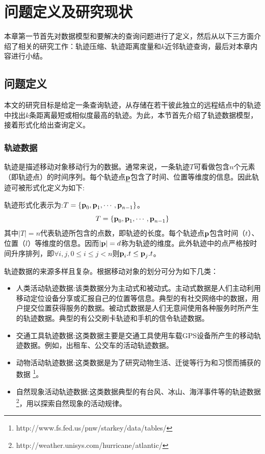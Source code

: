 \chapter{问题定义及研究现状}\label{chapter:relatedwork}
本章第一节首先对数据模型和要解决的查询问题进行了定义，然后从以下三方面介绍了相关的研究工作：轨迹压缩、轨迹距离度量和$k$近邻轨迹查询，最后对本章内容进行小结。

\section{问题定义}\label{chapter-related-coll}
本文的研究目标是给定一条查询轨迹，从存储在若干彼此独立的远程结点中的轨迹中找出$k$条距离最短或相似度最高的轨迹。为此，本节首先介绍了轨迹数据模型，接着形式化给出查询定义。

\subsection{轨迹数据}
轨迹是描述移动对象移动行为的数据。通常来说，一条轨迹$T$可看做包含$n$个元素（即轨迹点）的时间序列。每个轨迹点$\emph{{\textbf{p}}}$包含了时间、位置等维度的信息。因此轨迹可被形式化定义为如下:
\begin{define}[轨迹]
轨迹形式化表示为:$T=\{\textbf{p}_{0}, \textbf{p}_{1},\cdots, \textbf{p}_{n-1}\}$。
\begin{equation}
T=\{\textbf{p}_{0}, \textbf{p}_{1},\cdots, \textbf{p}_{n-1}\}
\end{equation}
其中$|T|=n$代表轨迹所包含的点数，即轨迹的长度。每个轨迹点$\textbf{p}$包含时间（$t$）、位置（$l$）等维度的信息。因而$|\textbf{p}|=d$称为轨迹的维度。此外轨迹中的点严格按时间升序排列，即$\forall i,j,0\le i\le j < n$则$\textbf{p}_{i}.t \le \textbf{p}_{j}.t$。
\end{define}

轨迹数据的来源多样且复杂。根据移动对象的划分可分为如下几类\cite{GQSurvery}：
\begin{itemize}
	\item \textsf{人类活动轨迹数据:}该类数据分为主动式和被动式。主动式数据是人们主动利用移动定位设备分享或汇报自己的位置等信息。典型的有社交网络中的数据，用户提交位置获得服务的数据。被动式数据是人们无意间使用各种服务时所产生的轨迹数据。典型的有公交刷卡轨迹\cite{WYL}和手机的信令轨迹数据\cite{zzgSF}。

	\item \textsf{交通工具轨迹数据:}这类数据主要是交通工具使用车载GPS设备所产生的移动轨迹数据。例如，出租车、公交车的活动轨迹数据\cite{DTKST}。
	
	\item \textsf{动物活动轨迹数据:}这类数据是为了研究动物生活、迁徙等行为和习惯而捕获的数据\cite{LeeHW07}
	\footnote{http://www.fs.fed.us/pnw/starkey/data/tables/}。
	
		\item \textsf{自然现象活动轨迹数据:}这类数据典型的有台风、冰山、海洋事件等的轨迹数据\footnote{http://weather.unisys.com/hurricane/atlantic/}，用以探索自然现象的活动规律。
\end{itemize}

